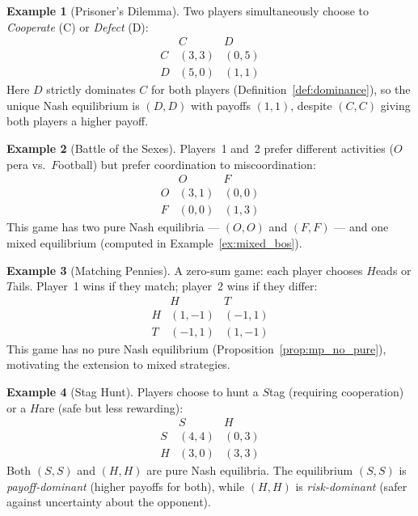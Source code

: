 \documentclass[11pt,a4paper]{article}
\theoremstyle{definition}
\newtheorem{example}{Example}[section]
\theoremstyle{plain}
\theoremstyle{remark}
\begin{document}
\begin{example}[Prisoner's Dilemma]
\label{ex:pd}
Two players simultaneously choose to \emph{Cooperate} (C) or \emph{Defect} (D):
\[
\begin{array}{c|cc}
 & C & D \\ \hline
C & (3,3) & (0,5) \\
D & (5,0) & (1,1)
\end{array}
\]
Here $D$ strictly dominates $C$ for both players (Definition~\ref{def:dominance}),
so the unique Nash equilibrium is $(D,D)$ with payoffs $(1,1)$, despite $(C,C)$
giving both players a higher payoff.
\end{example}

\begin{example}[Battle of the Sexes]
\label{ex:bos}
Players~1 and~2 prefer different activities ($O$pera vs.\ $F$ootball) but prefer
coordination to miscoordination:
\[
\begin{array}{c|cc}
 & O & F \\ \hline
O & (3,1) & (0,0) \\
F & (0,0) & (1,3)
\end{array}
\]
This game has two pure Nash equilibria --- $(O,O)$ and $(F,F)$ --- and one mixed
equilibrium (computed in Example~\ref{ex:mixed_bos}).
\end{example}

\begin{example}[Matching Pennies]
\label{ex:mp}
A zero-sum game: each player chooses $H$eads or $T$ails. Player~1 wins if
they match; player~2 wins if they differ:
\[
\begin{array}{c|cc}
 & H & T \\ \hline
H & (1,-1) & (-1,1) \\
T & (-1,1) & (1,-1)
\end{array}
\]
This game has no pure Nash equilibrium (Proposition~\ref{prop:mp_no_pure}),
motivating the extension to mixed strategies.
\end{example}

\begin{example}[Stag Hunt]
\label{ex:stag}
Players choose to hunt a $S$tag (requiring cooperation) or a $H$are (safe but
less rewarding):
\[
\begin{array}{c|cc}
 & S & H \\ \hline
S & (4,4) & (0,3) \\
H & (3,0) & (3,3)
\end{array}
\]
Both $(S,S)$ and $(H,H)$ are pure Nash equilibria. The equilibrium $(S,S)$ is
\emph{payoff-dominant} (higher payoffs for both), while $(H,H)$ is \emph{risk-dominant}
(safer against uncertainty about the opponent).
\end{example}
\end{document}

